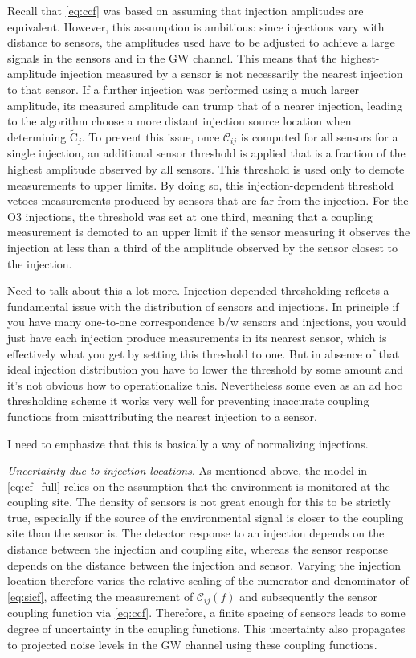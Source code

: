 Recall that \cref{eq:ccf} was based on assuming that injection amplitudes are equivalent.
However, this assumption is ambitious: since injections vary with distance to sensors, the amplitudes used have to be adjusted to achieve a large signals in the sensors and in the \ac{GW} channel.
This means that the highest-amplitude injection measured by a sensor is not necessarily the nearest injection to that sensor.
If a further injection was performed using a much larger amplitude, its measured amplitude can trump that of a nearer injection, leading to the algorithm choose a more distant injection source location when determining $\widetilde{\mathrm{C}}_j$.
To prevent this issue, once $\mathcal{C}_{ij}$ is computed for all sensors for a single injection, an additional sensor threshold is applied that is a fraction of the highest amplitude observed by all sensors.
This threshold is used only to demote measurements to upper limits.
By doing so, this injection-dependent threshold vetoes measurements produced by sensors that are far from the injection.
For the \ac{O3} injections, the threshold was set at one third, meaning that a coupling measurement is demoted to an upper limit if the sensor measuring it observes the injection at less than a third of the amplitude observed by the sensor closest to the injection.

{\color{red}
Need to talk about this a lot more.
Injection-depended thresholding reflects a fundamental issue with the distribution of sensors and injections.
In principle if you have many one-to-one correspondence b/w sensors and injections,
you would just have each injection produce measurements in its nearest sensor, which is effectively what you get by setting this threshold to one.
But in absence of that ideal injection distribution you have to lower the threshold by some amount and it's not obvious how to operationalize this.
Nevertheless some even as an ad hoc thresholding scheme it works very well for preventing inaccurate coupling functions from misattributing the nearest injection to a sensor.

I need to emphasize that this is basically a way of normalizing injections.}

\textit{Uncertainty due to injection locations}.
As mentioned above, the model in \cref{eq:cf_full} relies on the assumption that the environment is monitored at the coupling site.
The density of sensors is not great enough for this to be strictly true, especially if the source of the environmental signal is closer to the coupling site than the sensor is.
The detector response to an injection depends on the distance between the injection and coupling site, whereas the sensor response depends on the distance between the injection and sensor.
Varying the injection location therefore varies the relative scaling of the numerator and denominator of \cref{eq:sicf}, affecting the measurement of $\mathcal{C}_{ij}(f)$ and subsequently the sensor coupling function via \cref{eq:ccf}.
Therefore, a finite spacing of sensors leads to some degree of uncertainty in the coupling functions.
This uncertainty also propagates to projected noise levels in the \ac{GW} channel using these coupling functions.

